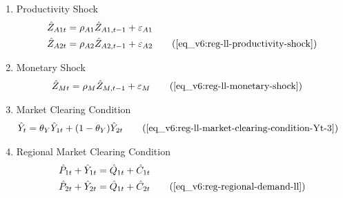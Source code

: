 \documentclass[../thesis.tex]{subfiles}
\begin{document}
{\begin{enumerate}
	\item Productivity Shock
	\begin{alignat}{2}
		\hat{Z}_{A1 t} &= \rho_{A1} \hat{Z}_{A1, t-1} + \varepsilon_{A1} \nonumber \\
		\hat{Z}_{A2 t} &= \rho_{A2} \hat{Z}_{A2, t-1} + \varepsilon_{A2} \tag{\ref{eq_v6:reg-ll-productivity-shock}}
	\end{alignat}
	
	\item Monetary Shock
	\begin{alignat}{2}
		\hat{Z}_{Mt} &= \rho_M \hat{Z}_{M,t-1} + \varepsilon_{M} \tag{\ref{eq_v6:reg-ll-monetary-shock}}
	\end{alignat}
	
	\item Market Clearing Condition
	\begin{align}
		\hat{Y}_{t} &= \theta_{Y} \hat{Y}_{1t} + (1-\theta_{Y}) \hat{Y}_{2t} \tag{\ref{eq_v6:reg-ll-market-clearing-condition-Yt-3}}
	\end{align}
	
	\item Regional Market Clearing Condition
	\begin{align}
		\hat{P}_{1 t} + \hat{Y}_{1 t} &= \hat{Q}_{1t} + \hat{C}_{1 t} \nonumber \\
		\hat{P}_{2 t} + \hat{Y}_{2 t} &= \hat{Q}_{1t} + \hat{C}_{2 t} \tag{\ref{eq_v6:reg-regional-demand-ll}}
	\end{align}
		
	\end{enumerate}
	
} %
\end{document}
